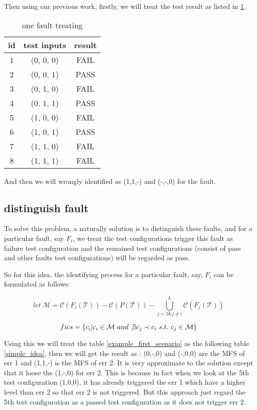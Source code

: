 \documentclass{sig-alternate}
\begin{document}
Then using our previous work, firstly, we will treat the test result as listed in \ref{previous_work}.

\begin{table}
\centering
\caption{one fault treating}
\label{previous_work}
\begin{tabular}{|c|c|c|} \hline
id&test inputs & result\\ \hline
1&(0, 0, 0) &  FAIL\\ \hline
2&(0, 0, 1) &  PASS\\ \hline
3&(0, 1, 0) &  FAIL\\ \hline
4&(0, 1, 1) &  PASS\\ \hline
5&(1, 0, 0) &  FAIL\\ \hline
6&(1, 0, 1) &  PASS\\ \hline
7&(1, 1, 0) &  FAIL\\ \hline
8&(1, 1, 1) &  FAIL\\ \hline
\hline\end{tabular}
\end{table}

And then we will wrongly identified as (1,1,-) and (-,-,0) for the fault.

\subsection{distinguish fault}

To solve this problem, a naturally solution is to distinguish these faults, and for a particular fault, say $F_{i}$, we treat the test configurations trigger this fault as failure test configuration and the remained test configurations (consist of pass and other faults test configurations) will be regarded as pass.

So for this idea, the identifying process for a particular fault, say, $F_{i}$ can be formulated as follows:

$$let\ \mathcal{M} = \mathcal{C}(F_{i}(\mathcal{T})) - \mathcal{C}(P(\mathcal{T})) - \bigcup_{j = 1 \& j \neq i }^{L}\mathcal{C}(F_{j}(\mathcal{T}))$$

$$fics = \{c_{i} | c_{i} \in \mathcal{M} \ and \not\exists c_{j} \prec c_{i}\ s.t.\ c_{j} \in \mathcal{M} \}$$

Using this we will treat the table \ref{example_first_scenario} as the following table \ref{simple_idea}, then we will get the result as : (0,-,0) and (-,0,0) are the MFS of err 1 and (1,1,-) is the MFS of err 2. It is very approximate to the solution except that it loose the (1,-,0) for err 2. This is because in fact when we look at the 5th test configuration (1,0,0), it has already triggered the err 1 which have a higher level than err 2 so that err 2 is not triggered. But this approach just regard the 5th test configuration as a passed test configuration as it does not trigger err 2.
\end{document}
